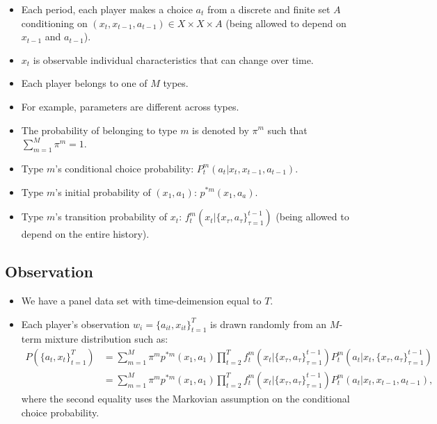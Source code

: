 \documentclass[
]{book}
\providecommand{\tightlist}{%
  \setlength{\itemsep}{0pt}\setlength{\parskip}{0pt}}
\begin{document}
\begin{itemize}
\tightlist
\item
  Each period, each player makes a choice \(a_t\) from a discrete and finite set \(A\) conditioning on \((x_t, x_{t - 1}, a_{t - 1}) \in X \times X \times A\) (being allowed to depend on \(x_{t - 1}\) and \(a_{t - 1}\)).
\item
  \(x_t\) is observable individual characteristics that can change over time.
\item
  Each player belongs to one of \(M\) types.
\item
  For example, parameters are different across types.
\item
  The probability of belonging to type \(m\) is denoted by \(\pi^m\) such that \(\sum_{m = 1}^M \pi^m = 1\).
\item
  Type \(m\)'s conditional choice probability: \(P_t^m(a_t|x_t, x_{t - 1}, a_{t - 1})\).
\item
  Type \(m\)'s initial probability of \((x_1, a_1)\): \(p^{*m}(x_1, a_a)\).
\item
  Type \(m\)'s transition probability of \(x_t\): \(f_t^m(x_t|\{x_{\tau}, a_{\tau}\}_{\tau = 1}^{t - 1})\) (being allowed to depend on the entire history).
\end{itemize}

\hypertarget{observation}{%
\subsection{Observation}\label{observation}}

\begin{itemize}
\tightlist
\item
  We have a panel data set with time-deimension equal to \(T\).
\item
  Each player's observation \(w_i = \{a_{it}, x_{it}\}_{t = 1}^T\) is drawn randomly from an \(M\)-term mixture distribution such as:
  \[
  \begin{split}
  P(\{a_t, x_t\}_{t = 1}^T) &= \sum_{m = 1}^M \pi^m p^{*m}(x_1, a_1) \prod_{t = 2}^T f_t^m(x_t|\{x_\tau, a_\tau\}_{\tau = 1}^{t - 1}) P_t^m(a_t| x_t, \{x_\tau, a_\tau\}_{\tau = 1}^{t - 1})\\
  &= \sum_{m = 1}^M \pi^m p^{*m}(x_1, a_1) \prod_{t = 2}^T f_t^m(x_t|\{x_\tau, a_\tau\}_{\tau = 1}^{t - 1}) P_t^m(a_t| x_t, x_{t - 1}, a_{t - 1}),
  \end{split}
  \]
  where the second equality uses the Markovian assumption on the conditional choice probability.
\end{itemize}
\end{document}
